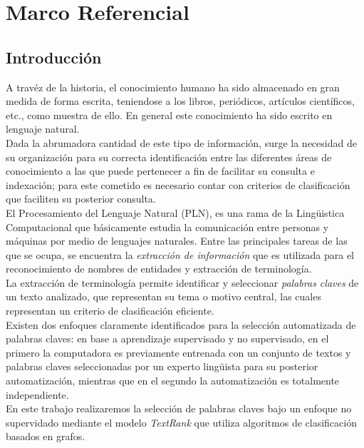 \chapter{Marco Referencial}
\section{Introducci\'on}
A trav\'ez de la historia, el conocimiento humano ha sido almacenado en gran medida
de forma escrita, teniendose a los libros, peri\'odicos, art\'iculos cient\'ificos,
etc., como muestra de ello. En general este conocimiento ha sido escrito en lenguaje
natural. \\

Dada la abrumadora cantidad de este tipo de informaci\'on, surge la necesidad de su 
organizaci\'on para su correcta identificaci\'on entre las diferentes \'areas de 
conocimiento a las que puede pertenecer a fin de facilitar su consulta e 
indexaci\'on; para este cometido es necesario contar con criterios de clasificaci\'on 
que faciliten su posterior consulta. \\

El Procesamiento del Lenguaje Natural (PLN), es una rama de la Ling\"uistica 
Computacional que b\'asicamente estudia la comunicaci\'on entre personas y 
m\'aquinas por medio de lenguajes naturales. Entre las principales tareas de las que 
se ocupa, se encuentra la \emph{extracci\'on de informaci\'on} que es utilizada 
para el reconocimiento de nombres de entidades y extracci\'on de terminolog\'ia. \\

La extracci\'on de terminolog\'ia permite identificar y seleccionar 
\emph{palabras claves} de un texto analizado, que representan su tema o 
motivo central, las cuales representan un criterio de clasificaci\'on eficiente.\\

Existen dos enfoques claramente identificados para la selecci\'on automatizada
de palabras claves: en base a aprendizaje supervisado y no supervisado, en el primero 
la computadora es previamente entrenada con un conjunto de textos y palabras 
claves seleccionadas por un experto ling\"uista para su posterior automatizaci\'on, 
mientras que en el segundo la automatizaci\'on es totalmente independiente.\\

En este trabajo realizaremos la selecci\'on de palabras claves bajo un enfoque no
supervidado mediante el modelo \emph{TextRank} que utiliza algoritmos de 
clasificaci\'on basados en grafos.\\

